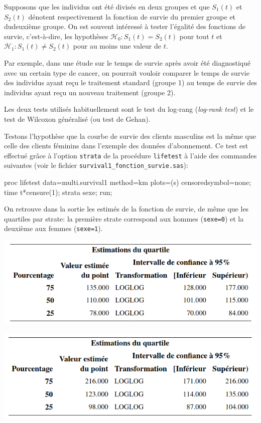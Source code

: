 \documentclass[
  11pt,
  letterpaper,
]{book}
\newenvironment{Shaded}{\begin{snugshade}}{\end{snugshade}}
\newcommand{\NormalTok}[1]{#1}
\theoremstyle{definition}
\theoremstyle{definition}
\theoremstyle{definition}
\theoremstyle{definition}
\theoremstyle{remark}
\begin{document}
Supposons que les individus ont été divisés en deux groupes et que \(S_1(t)\) et \(S_2(t)\) dénotent respectivement la fonction de survie du premier groupe et dudeuxième groupe. On est souvent intéressé à tester l'égalité des fonctions de survie, c'est-à-dire, les hypothèses \(\mathcal{H}_0: S_1(t) = S_2(t)\) pour tout \(t\) et \(\mathcal{H}_1: S_1(t) \neq S_2(t)\) pour au moins une valeur de \(t\).

Par exemple, dans une étude sur le temps de survie après avoir été diagnostiqué avec un certain type de cancer, on pourrait vouloir comparer le temps de survie des individus ayant reçu le traitement standard (groupe 1) au temps de survie des individus ayant reçu un nouveau traitement (groupe 2).

Les deux tests utilisés habituellement sont le test du log-rang (\emph{log-rank test}) et le test de Wilcoxon généralisé (ou test de Gehan).

Testons l'hypothèse que la courbe de survie des clients masculins est la même que celle des clients féminins dans l'exemple des données d'abonnement. Ce test est effectué grâce à l'option \texttt{strata} de la procédure \texttt{lifetest} à l'aide des commandes suivantes (voir le fichier \texttt{survival1\_fonction\_survie.sas}):

\begin{Shaded}
\begin{Highlighting}[]
\NormalTok{proc lifetest data=multi.survival1 method=km plots=(s) censoredsymbol=none;}
\NormalTok{time t*censure(1);}
\NormalTok{strata sexe;}
\NormalTok{run;}
\end{Highlighting}
\end{Shaded}

On retrouve dans la sortie les estimés de la fonction de survie, de même que les quartiles par strate: la première strate correspond aux hommes (\texttt{sexe=0}) et la deuxième aux femmes (\texttt{sexe=1}).

\begin{center}\includegraphics[width=0.75\linewidth]{figures/05-survie-e6} \end{center}

\begin{center}\includegraphics[width=0.75\linewidth]{figures/05-survie-e7} \end{center}
\end{document}
